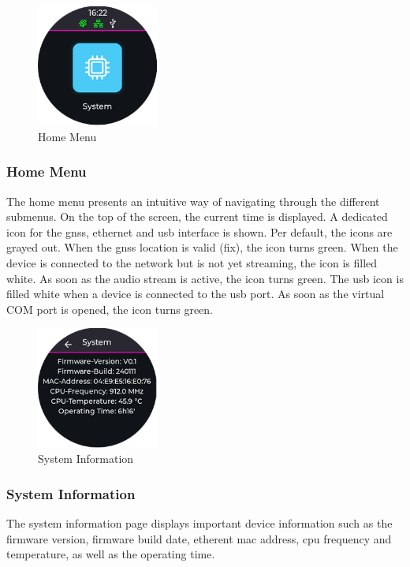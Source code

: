\begin{minipage}{\linewidth}
	\begin{figure}
		\vspace{-0.6cm}
		\includegraphics[width=4cm]{images/6_design_final/gui/01_main_menu.png}
		\centering
		\caption{Home Menu}
		\label{fig:final_design_gui_home_menu}
	\end{figure}
	\subsubsection{Home Menu}
	The home menu presents an intuitive way of navigating through the different submenus.
	On the top of the screen, the current time is displayed.
	A dedicated icon for the \acrshort{gnss}, ethernet and \acrshort{usb} interface is shown.
	Per default, the icons are grayed out.
	When the \acrshort{gnss} location is valid (fix), the icon turns green.
	When the device is connected to the network but is not yet streaming, the icon is filled white.
	As soon as the audio stream is active, the icon turns green.
	The \acrshort{usb} icon is filled white when a device is connected to the \acrshort{usb} port.
	As soon as the virtual COM port is opened, the icon turns green.
\end{minipage}
\vspace{0.1cm}

\begin{minipage}{\linewidth}
	\begin{figure}
		\vspace{-0.6cm}
		\includegraphics[width=4cm]{images/6_design_final/gui/03_system_info.png}
		\centering
		\caption{System Information}
		\label{fig:final_design_gui_system_info}
	\end{figure}
	\subsubsection{System Information}
	The system information page displays important device information such as the firmware version,
	firmware build date, etherent \acrshort{mac} address, \acrshort{cpu} frequency and temperature, as well as the operating time.
\end{minipage}
\vspace{2.1cm}

